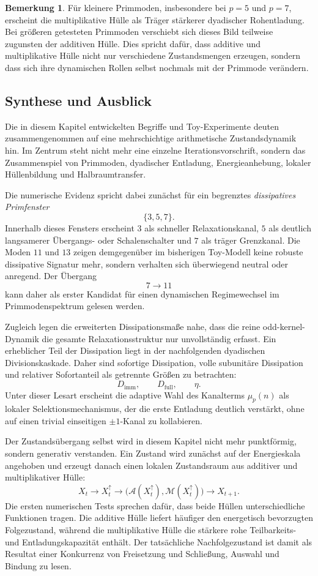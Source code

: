 \documentclass[11pt,a4paper]{article}
\theoremstyle{definition}
\newtheorem{bemerkung}{Bemerkung}
\begin{document}
\begin{bemerkung}
	Für kleinere Primmoden, insbesondere bei \(p=5\) und \(p=7\), erscheint die multiplikative Hülle als Träger stärkerer dyadischer Rohentladung. Bei größeren getesteten Primmoden verschiebt sich dieses Bild teilweise zugunsten der additiven Hülle. Dies spricht dafür, dass additive und multiplikative Hülle nicht nur verschiedene Zustandsmengen erzeugen, sondern dass sich ihre dynamischen Rollen selbst nochmals mit der Primmode verändern.
\end{bemerkung}
\subsection{Synthese und Ausblick}

Die in diesem Kapitel entwickelten Begriffe und Toy-Experimente deuten zusammengenommen auf eine mehrschichtige arithmetische Zustandsdynamik hin. Im Zentrum steht nicht mehr eine einzelne Iterationsvorschrift, sondern das Zusammenspiel von Primmoden, dyadischer Entladung, Energieanhebung, lokaler Hüllenbildung und Halbraumtransfer.

Die numerische Evidenz spricht dabei zunächst für ein begrenztes \emph{dissipatives Primfenster}
\[
\{3,5,7\}.
\]
Innerhalb dieses Fensters erscheint \(3\) als schneller Relaxationskanal, \(5\) als deutlich langsamerer Übergangs- oder Schalenschalter und \(7\) als träger Grenzkanal. Die Moden \(11\) und \(13\) zeigen demgegenüber im bisherigen Toy-Modell keine robuste dissipative Signatur mehr, sondern verhalten sich überwiegend neutral oder anregend. Der Übergang
\[
7\longrightarrow 11
\]
kann daher als erster Kandidat für einen dynamischen Regimewechsel im Primmodenspektrum gelesen werden.

Zugleich legen die erweiterten Dissipationsmaße nahe, dass die reine odd-kernel-Dynamik die gesamte Relaxationsstruktur nur unvollständig erfasst. Ein erheblicher Teil der Dissipation liegt in der nachfolgenden dyadischen Divisionskaskade. Daher sind sofortige Dissipation, volle subunitäre Dissipation und relativer Sofortanteil als getrennte Größen zu betrachten:
\[
D_{\mathrm{imm}},\qquad D_{\mathrm{full}},\qquad \eta.
\]
Unter dieser Lesart erscheint die adaptive Wahl des Kanalterms \(\mu_p(n)\) als lokaler Selektionsmechanismus, der die erste Entladung deutlich verstärkt, ohne auf einen trivial einseitigen \(\pm1\)-Kanal zu kollabieren.

Der Zustandsübergang selbst wird in diesem Kapitel nicht mehr punktförmig, sondern generativ verstanden. Ein Zustand wird zunächst auf der Energieskala angehoben und erzeugt danach einen lokalen Zustandsraum aus additiver und multiplikativer Hülle:
\[
X_t \longrightarrow X_t^\uparrow \longrightarrow \bigl(\mathcal{A}(X_t^\uparrow),\mathcal{M}(X_t^\uparrow)\bigr) \longrightarrow X_{t+1}.
\]
Die ersten numerischen Tests sprechen dafür, dass beide Hüllen unterschiedliche Funktionen tragen. Die additive Hülle liefert häufiger den energetisch bevorzugten Folgezustand, während die multiplikative Hülle die stärkere rohe Teilbarkeits- und Entladungskapazität enthält. Der tatsächliche Nachfolgezustand ist damit als Resultat einer Konkurrenz von Freisetzung und Schließung, Auswahl und Bindung zu lesen.
\end{document}
